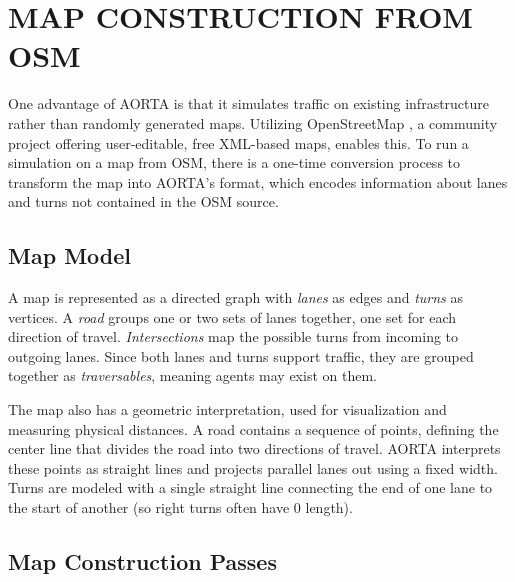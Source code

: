 \documentclass[letterpaper, 10 pt, conference]{ieeeconf}  %
\begin{document}
\section{MAP CONSTRUCTION FROM OSM}
\label{sec:map}

One advantage of AORTA is that it simulates traffic on existing infrastructure
rather than randomly generated maps. Utilizing OpenStreetMap \cite{osm}, a
community project offering user-editable, free XML-based maps, enables this. To
run a simulation on a map from OSM, there is a one-time conversion process to
transform the map into AORTA's format, which encodes information about lanes and
turns not contained in the OSM source.

\subsection{Map Model}


A map is represented as a directed graph with \emph{lanes} as edges and
\emph{turns} as vertices. A \emph{road} groups one or two sets of lanes
together, one set for each direction of travel.
\emph{Intersections} map the possible turns from incoming to outgoing lanes.
Since both lanes and turns support traffic, they are grouped together as
\emph{traversables}, meaning agents may exist on them.

The map also has a geometric interpretation, used for visualization and
measuring physical distances. A road contains a sequence of points, defining the
center line that divides the road into two directions of travel. AORTA
interprets these points as straight lines and projects parallel lanes out using
a fixed width. Turns are modeled with a single straight line connecting the end
of one lane to the start of another (so right turns often have 0 length).

\subsection{Map Construction Passes}
\end{document}
